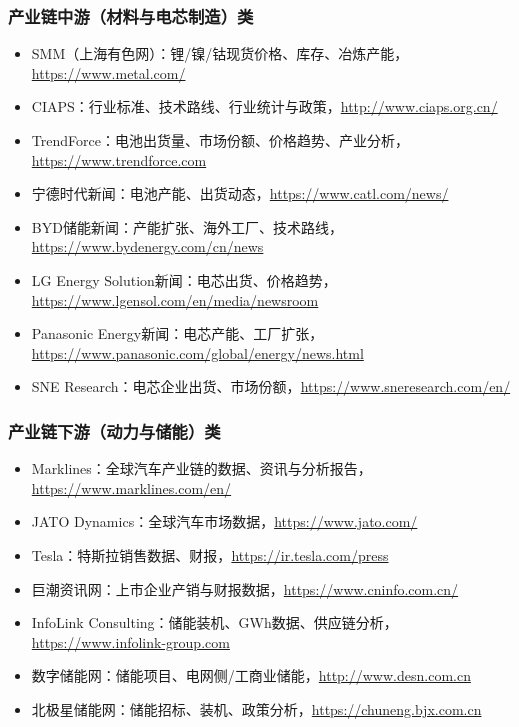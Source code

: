 \documentclass[12pt,a4paper]{article}
\begin{document}
\subsubsection{产业链中游（材料与电芯制造）类}
\begin{itemize}
    \item SMM（上海有色网）：锂/镍/钴现货价格、库存、冶炼产能，\url{https://www.metal.com/}
    \item CIAPS：行业标准、技术路线、行业统计与政策，\url{http://www.ciaps.org.cn/}
    \item TrendForce：电池出货量、市场份额、价格趋势、产业分析，\url{https://www.trendforce.com}
    \item 宁德时代新闻：电池产能、出货动态，\url{https://www.catl.com/news/}
    \item BYD储能新闻：产能扩张、海外工厂、技术路线，\url{https://www.bydenergy.com/cn/news}
    \item LG Energy Solution新闻：电芯出货、价格趋势，\url{https://www.lgensol.com/en/media/newsroom}
    \item Panasonic Energy新闻：电芯产能、工厂扩张，\url{https://www.panasonic.com/global/energy/news.html}
    \item SNE Research：电芯企业出货、市场份额，\url{https://www.sneresearch.com/en/}
\end{itemize}

\subsubsection{产业链下游（动力与储能）类}
\begin{itemize}
    \item Marklines：全球汽车产业链的数据、资讯与分析报告，\url{https://www.marklines.com/en/}
    \item JATO Dynamics：全球汽车市场数据，\url{https://www.jato.com/}
    \item Tesla：特斯拉销售数据、财报，\url{https://ir.tesla.com/press}
    \item 巨潮资讯网：上市企业产销与财报数据，\url{https://www.cninfo.com.cn/}
    \item InfoLink Consulting：储能装机、GWh数据、供应链分析，\url{https://www.infolink-group.com}
    \item 数字储能网：储能项目、电网侧/工商业储能，\url{http://www.desn.com.cn}
    \item 北极星储能网：储能招标、装机、政策分析，\url{https://chuneng.bjx.com.cn}
\end{itemize}
\end{document}
